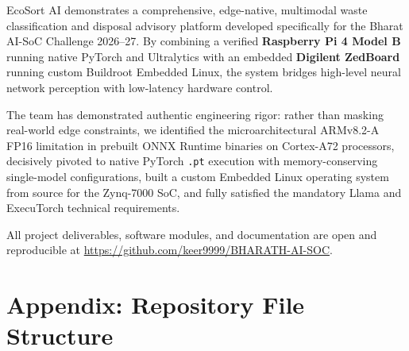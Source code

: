 \documentclass[12pt,a4paper]{article}
\begin{document}
EcoSort AI demonstrates a comprehensive, edge-native, multimodal waste classification
and disposal advisory platform developed specifically for the Bharat AI-SoC Challenge 2026--27.
By combining a verified \textbf{Raspberry Pi 4 Model B} running native PyTorch and Ultralytics
with an embedded \textbf{Digilent ZedBoard} running custom Buildroot Embedded Linux, the system
bridges high-level neural network perception with low-latency hardware control.

The team has demonstrated authentic engineering rigor: rather than masking real-world edge
constraints, we identified the microarchitectural ARMv8.2-A FP16 limitation in prebuilt ONNX
Runtime binaries on Cortex-A72 processors, decisively pivoted to native PyTorch \texttt{.pt}
execution with memory-conserving single-model configurations, built a custom Embedded Linux operating
system from source for the Zynq-7000 SoC, and fully satisfied the mandatory Llama and ExecuTorch
technical requirements.

All project deliverables, software modules, and documentation are open and reproducible at
\url{https://github.com/keer9999/BHARATH-AI-SOC}.

\clearpage

\section*{Appendix: Repository File Structure}
\end{document}
